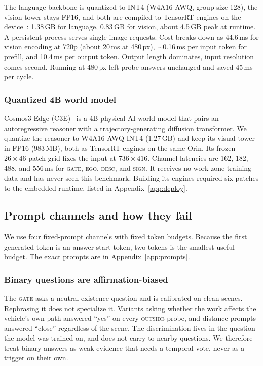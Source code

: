 \documentclass[journal]{IEEEtran}
\newcommand{\st}[1]{\textsc{#1}}
\begin{document}
The language backbone is quantized to INT4 (W4A16 AWQ, group size 128), the vision tower stays FP16, and both are compiled to TensorRT engines on the device~\cite{trtedgellm}: 1.38\,GB for language, 0.83\,GB for vision, about 4.5\,GB peak at runtime.  A persistent process serves single-image requests. Cost breaks down as 44.6\,ms for vision encoding at 720p (about 20\,ms at 480\,px), $\sim$0.16\,ms per input token for prefill, and 10.4\,ms per output token.  Output length dominates, input resolution comes second.  Running at 480\,px left probe answers unchanged and saved 45\,ms per cycle.

\subsubsection{Quantized 4B world model}
Cosmos3-Edge (C3E)~\cite{nvidia2026cosmos3} is a 4B physical-AI world model that pairs an autoregressive reasoner with a trajectory-generating diffusion transformer.  We quantize the reasoner to W4A16 AWQ INT4 (1.27\,GB) and keep its visual tower in FP16 (983\,MB), both as TensorRT engines on the same Orin.  Its frozen $26{\times}46$ patch grid fixes the input at $736{\times}416$.  Channel latencies are 162, 182, 488, and 556\,ms for \st{gate}, \st{ego}, \st{desc}, and \st{sign}.  It receives no work-zone training data and has never seen this benchmark.  Building its engines required six patches to the embedded runtime, listed in Appendix~\ref{app:deploy}.

\subsection{Prompt channels and how they fail}
\label{sec:prompts}

We use four fixed-prompt channels with fixed token budgets.  Because the first generated token is an answer-start token, two tokens is the smallest useful budget.  The exact prompts are in Appendix~\ref{app:prompts}.

\subsubsection{Binary questions are affirmation-biased}
The \st{gate} asks a neutral existence question and is calibrated on clean scenes.  Rephrasing it does not specialize it.  Variants asking whether the work affects the vehicle's own path answered ``yes'' on every \st{outside} probe, and distance prompts answered ``close'' regardless of the scene.  The discrimination lives in the question the model was trained on, and does not carry to nearby questions.  We therefore treat binary answers as weak evidence that needs a temporal vote, never as a trigger on their own.
\end{document}

